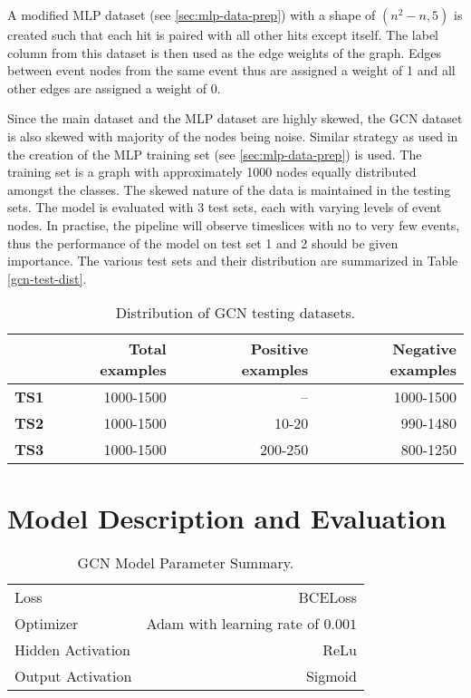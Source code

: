 A modified MLP dataset (see \ref{sec:mlp-data-prep}) with a shape of
\texttt{$(n^{2}-n, 5)$} is created such that each hit is paired with
all other hits except itself. The label column from this dataset is
then used as the edge weights of the graph. Edges between event nodes
from the same event thus are assigned a weight of 1 and all other
edges are assigned a weight of 0.

Since the main dataset and the MLP dataset are highly skewed, the GCN
dataset is also skewed with majority of the nodes being noise. Similar
strategy as used in the creation of the MLP training set (see
\ref{sec:mlp-data-prep}) is used. The training set is a graph with
approximately 1000 nodes equally distributed amongst the classes. The
skewed nature of the data is maintained in the testing sets. The model
is evaluated with 3 test sets, each with varying levels of event
nodes. In practise, the pipeline will observe timeslices with no to
very few events, thus the performance of the model on test set 1 and 2
should be given importance. The various test sets and their
distribution are summarized in Table \ref{gcn-test-dist}.

\begin{table}[htb]
  \centering
  \caption{Distribution of GCN testing datasets.}
  \begin{tabular}{lrrr}
    \hline
    & Total examples & Positive examples & Negative examples \\
    \hline
    \textbf{TS1} & 1000-1500 & -- & 1000-1500 \\
    \textbf{TS2} & 1000-1500 & 10-20 & 990-1480 \\
    \textbf{TS3} & 1000-1500 & 200-250 & 800-1250 \\
    \hline
  \end{tabular}
  \label{tab:gcn-test-dst}
\end{table}

\section{Model Description and Evaluation}
\label{sec:gcn-model-desc-eval}

\begin{table}[htb]
  \centering
  \caption{GCN Model Parameter Summary.}
  \begin{tabular}{lr}
    \hline
    Loss & BCELoss \\
    Optimizer & Adam with learning rate of $0.001$ \\
    Hidden Activation & ReLu \\
    Output Activation & Sigmoid \\
    \hline
  \end{tabular}
  \label{tab:gcn-model-param}
\end{table}

